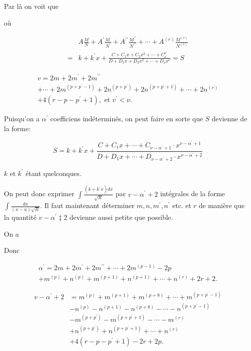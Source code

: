 \documentclass{article}
\begin{document}
Par là on voit que

où

\[
\begin{aligned}
& A \frac{M}{N}+A^{\prime} \frac{M^{\prime}}{N^{\prime}}+A^{\prime \prime} \frac{M^{\prime \prime}}{N^{\prime \prime}}+\cdots+A^{(r)} \frac{M^{(r)}}{N^{(r)}} \\
= & k+k^{\prime} x+\frac{C+C_{1} x+C_{2} x^{2}+\cdots+C_{\nu^{\prime}}^{\nu^{\prime}}}{D+D_{1} x+D_{2} x^{2}+\cdots+D_{\nu} x^{\nu}}=S
\end{aligned}
\]

\[
\begin{gathered}
v=2 m+2 m^{\prime}+2 m^{\prime \prime} \\
+\cdots+2 m^{\left(p+p^{\prime}-1\right)}+2 n^{\left(p+p^{\prime}\right)}+2 n^{\left(p+p^{\prime}+1\right)}+\cdots+2 n^{(r)} \\
+4\left(r-p-p^{\prime}+1\right), \text { et } v^{\prime}<\nu .
\end{gathered}
\]

Puisqu'on a \(\alpha^{\prime}\) coefficiens indéterminés, on peut faire en sorte que \(S\) devienne de la forme:

\[
S=k+k^{\prime} x+\frac{C+C_{1} x+\cdots+C_{\nu-\alpha^{\prime}+1} \cdot x^{\nu-\alpha^{\prime}+1}}{D+D_{1} x+\cdots+D_{\nu-\alpha^{\prime}+2} \cdot x^{\nu-\alpha^{\prime}+2}}
\]

\(k\) et \(k^{\prime}\) étant quelconques.

On peut donc exprimer \(\int \frac{\left(k+k^{\prime} x\right) d x}{\sqrt{R}}\) par \(v-\alpha^{\prime}+2\) intégrales de la
forme \(\int \frac{d x}{(x-a) \sqrt{R}}\). Il faut maintenant déterminer \(m, n, m^{\prime}, n^{\prime}\) etc. et \(r\) de manière que la quantité \(v-\alpha^{\prime} \ddagger 2\) devienne aussi petite que possible.

On a

Donc

\[
\begin{gathered}
\alpha^{\prime}=2 m+2 m^{\prime}+2 m^{\prime \prime}+\cdots+2 m^{(p-1)}-2 p \\
+m^{(p)}+n^{(p)}+m^{(p+1)}+n^{(p+1)}+\cdots+n^{(r)}+2 r+2 .
\end{gathered}
\]

\[
\begin{aligned}
v-\alpha^{\prime}+2 & =m^{(p)}+m^{(p+1)}+m^{(p+8)}+\cdots+m^{\left(p+p^{\prime}-1\right)} \\
& -n^{(p)}-n^{(p+1)}-n^{(p+8)}-\cdots-n^{\left(p+p^{\prime}-1\right)} \\
& -m^{\left(p+p^{\prime}\right)}-m^{\left(p+p^{\prime}+1\right)}-\cdots-m^{(r)} \\
& +n^{\left(p+p^{\prime}\right)}+n^{\left(p+p^{\prime}+1\right)}+\cdots+n^{(r)} \\
& +4\left(r-p-p^{\prime}+1\right)-2 r+2 p .
\end{aligned}
\]
\end{document}
